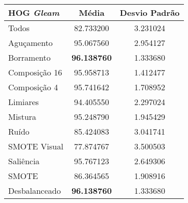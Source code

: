 \begin{table}[!htbp]
\centering
\caption{}
\label{tab:resultados:x:melhor}
\begin{tabular}{|l|c|c|}
\hline
\textbf{HOG \emph{Gleam}} & \textbf{Média}     & \textbf{Desvio Padrão} \\ \hline
   Todos        &  82.733200 &  3.231024  \\ \hline
  Aguçamento    &  95.067560 &  2.954127  \\ \hline
  Borramento    &  \textbf{96.138760} &  1.333680  \\ \hline
  Composição 16 &  95.958713 &  1.412477  \\ \hline
  Composição 4  &  95.741642 &  1.708952  \\ \hline
  Limiares      &  94.405550 &  2.297024  \\ \hline
  Mistura       &  95.248790 &  1.945429  \\ \hline
  Ruído         &  85.424083 &  3.041741  \\ \hline
  SMOTE Visual  &  77.874767 &  3.500503  \\ \hline
  Saliência     &  95.767123 &  2.649306  \\ \hline
 SMOTE          &  86.364565 &  1.908916  \\ \hline
Desbalanceado   &  \textbf{96.138760} &  1.333680  \\ \hline
\end{tabular}
\end{table}



